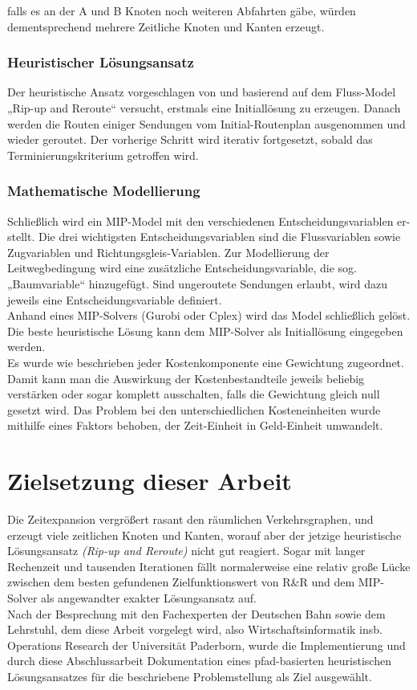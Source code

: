 falls es an der A und B Knoten noch weiteren Abfahrten gäbe, würden dementsprechend mehrere Zeitliche Knoten und Kanten erzeugt.

\subsubsection{Heuristischer Lösungsansatz}
Der heuristische Ansatz vorgeschlagen von \cite{homfeld2012consolidating} und basierend auf dem Fluss-Model „Rip-up and Reroute“ versucht, erstmals eine Initiallösung zu erzeugen. Danach werden die Routen einiger Sendungen vom Initial-Routenplan ausgenommen und wieder geroutet. Der vorherige Schritt wird iterativ fortgesetzt, sobald das Terminierungskriterium getroffen wird.

\subsubsection{Mathematische Modellierung}
Schließlich wird ein MIP-Model mit den verschiedenen Entscheidungsvariablen er-stellt. Die drei wichtigsten Entscheidungsvariablen sind die Flussvariablen sowie Zugvariablen und Richtungsgleis-Variablen. Zur Modellierung der Leitwegbedingung wird eine zusätzliche Entscheidungsvariable, die sog. „Baumvariable“ hinzugefügt. Sind ungeroutete Sendungen erlaubt, wird dazu jeweils eine Entscheidungsvariable definiert.\\
Anhand eines MIP-Solvers (Gurobi oder Cplex) wird das Model schließlich gelöst. Die beste heuristische Lösung kann dem MIP-Solver als Initiallösung eingegeben werden.\\
Es wurde wie beschrieben jeder Kostenkomponente eine Gewichtung zugeordnet. Damit kann man die Auswirkung der Kostenbestandteile jeweils beliebig verstärken oder sogar komplett ausschalten, falls die Gewichtung gleich null gesetzt wird. Das Problem bei den unterschiedlichen Kosteneinheiten wurde mithilfe eines Faktors behoben, der Zeit-Einheit in Geld-Einheit umwandelt.


\section{Zielsetzung dieser Arbeit}
\label{sec:Ziel}
Die Zeitexpansion vergrößert rasant den räumlichen Verkehrsgraphen, und erzeugt viele zeitlichen Knoten und Kanten, worauf aber der jetzige heuristische Lösungsansatz \emph{(Rip-up and Reroute)} nicht gut reagiert. Sogar mit langer Rechenzeit und tausenden Iterationen fällt normalerweise eine relativ große Lücke zwischen dem besten gefundenen Zielfunktionswert von R\&R und dem MIP-Solver als angewandter exakter Lösungsansatz auf.\\
Nach der Besprechung mit den Fachexperten der Deutschen Bahn sowie dem Lehrstuhl, dem diese Arbeit vorgelegt wird, also Wirtschaftsinformatik insb. Operations Research der Universität Paderborn, wurde die Implementierung und durch diese Abschlussarbeit Dokumentation eines pfad-basierten heuristischen Lösungsansatzes für die beschriebene Problemstellung als Ziel ausgewählt.


